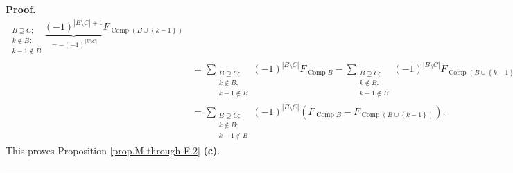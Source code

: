 \documentclass[numbers=enddot,12pt,final,onecolumn,notitlepage]{scrartcl}%
\theoremstyle{definition}
\newenvironment{proof}[1][Proof]{\noindent\textbf{#1.} }{\ \rule{0.5em}{0.5em}}
\let\sumnonlimits\sum
\renewcommand{\sum}{\sumnonlimits\limits}
\begin{document}
\begin{proof}
\begin{align*}
_{\substack{B\supseteq C;\\k\notin B;\\k-1\notin B}}\underbrace{\left(
-1\right)  ^{\left\vert B\setminus C\right\vert +1}}_{=-\left(  -1\right)
^{\left\vert B\setminus C\right\vert }}F_{\operatorname*{Comp}\left(
B\cup\left\{  k-1\right\}  \right)  }\\
&  =\sum_{\substack{B\supseteq C;\\k\notin B;\\k-1\notin B}}\left(  -1\right)
^{\left\vert B\setminus C\right\vert }F_{\operatorname*{Comp}B}-\sum
_{\substack{B\supseteq C;\\k\notin B;\\k-1\notin B}}\left(  -1\right)
^{\left\vert B\setminus C\right\vert }F_{\operatorname*{Comp}\left(
B\cup\left\{  k-1\right\}  \right)  }\\
&  =\sum_{\substack{B\supseteq C;\\k\notin B;\\k-1\notin B}}\left(  -1\right)
^{\left\vert B\setminus C\right\vert }\left(  F_{\operatorname*{Comp}%
B}-F_{\operatorname*{Comp}\left(  B\cup\left\{  k-1\right\}  \right)
}\right)  .
\end{align*}
This proves Proposition \ref{prop.M-through-F.2} \textbf{(c)}.
\end{proof}
\end{document}
